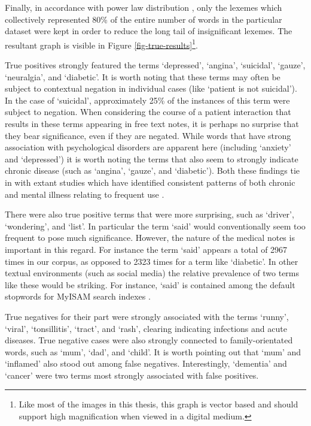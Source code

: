 Finally, in accordance with power law distribution \cite{clauset2009power},  only the lexemes which collectively represented 80\% of the entire number of words in the particular dataset were kept in order to reduce the long tail of insignificant lexemes. The resultant graph is visible in Figure \ref{fig-true-results}\footnote{Like most of the images in this thesis, this graph is vector based and should support high magnification when viewed in a digital medium.}.




True positives strongly featured the terms  `depressed', `angina', `suicidal', `gauze', `neuralgia', and `diabetic'. It is worth noting that these terms may often be subject to contextual negation in individual cases (like `patient is not suicidal'). In the case of `suicidal', approximately 25\% of the instances of this term were subject to negation. When considering the course of a patient interaction that results in these terms appearing in free text notes, it is perhaps no surprise that they bear significance, even if they are negated. While words that have strong association with psychological disorders are apparent here (including `anxiety' and `depressed') it is worth noting the terms that also seem to strongly indicate chronic disease (such as `angina', `gauze', and `diabetic'). Both these findings tie in with extant studies which have identified consistent patterns of both chronic and mental illness relating to frequent use \cite{buja2015determines}.

There were also true positive terms that were more surprising, such as `driver', `wondering', and `list'. In particular the term `said' would conventionally seem too frequent to pose much significance. However, the nature of the medical notes is important in this regard. For instance the term `said' appears a total of  2967 times in our corpus, as opposed to 2323 times for a term like `diabetic'. In other textual environments (such as social media) the relative prevalence of two terms like these would be striking. For instance, `said' is contained among the default stopwords for MyISAM search indexes \cite{mysql2019mysql}. 

True negatives for their part were strongly associated with the terms `runny', `viral', `tonsillitis', `tract', and `rash', clearing indicating infections and acute diseases. True negative cases were also strongly connected to family-orientated words, such as `mum', `dad', and `child'. It is worth pointing out that `mum' and `inflamed' also stood out among false negatives. Interestingly, `dementia' and `cancer' were two terms most strongly associated with false positives.   



